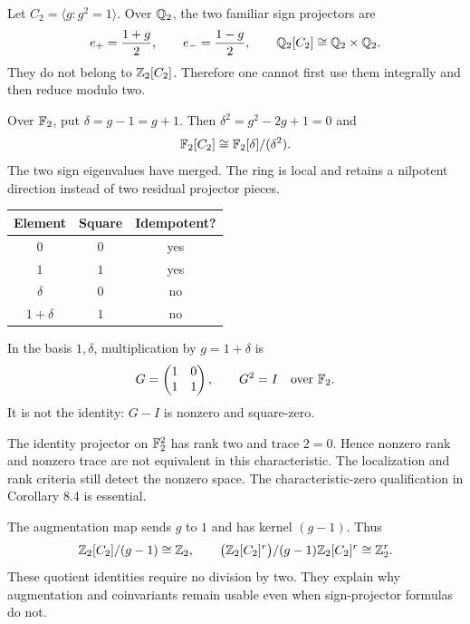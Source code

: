 Let $C_2=\langle g:g^2=1\rangle$. Over $\mathbb Q_2$, the two familiar sign projectors are
\[
e_+=\frac{1+g}{2},\qquad e_-=\frac{1-g}{2},
\qquad \mathbb Q_2[C_2]\cong\mathbb Q_2\times\mathbb Q_2.
\]
They do not belong to $\mathbb Z_2[C_2]$. Therefore one cannot first use them integrally and then reduce modulo two.

Over $\mathbb F_2$, put $\delta=g-1=g+1$. Then $\delta^2=g^2-2g+1=0$ and
\[
\mathbb F_2[C_2]\cong\mathbb F_2[\delta]/(\delta^2).
\]
The two sign eigenvalues have merged. The ring is local and retains a nilpotent direction instead of two residual projector pieces.

\begin{minipage}[c]{.48\linewidth}
\centering
\begin{tabular}{@{}ccc@{}}\toprule
Element & Square & Idempotent?\\\midrule
$0$ & $0$ & yes\\
$1$ & $1$ & yes\\
$\delta$ & $0$ & no\\
$1+\delta$ & $1$ & no\\\bottomrule
\end{tabular}
\end{minipage}\hfill
\begin{minipage}[c]{.47\linewidth}
In the basis $1,\delta$, multiplication by $g=1+\delta$ is
\[
G=\begin{pmatrix}1&0\\1&1\end{pmatrix},\qquad
G^2=I\quad\text{over }\mathbb F_2.
\]
It is not the identity: $G-I$ is nonzero and square-zero.
\end{minipage}

The identity projector on $\mathbb F_2^2$ has rank two and trace $2=0$. Hence nonzero rank and nonzero trace are not equivalent in this characteristic. The localization and rank criteria still detect the nonzero space. The characteristic-zero qualification in Corollary 8.4 is essential.

The augmentation map sends $g$ to $1$ and has kernel $(g-1)$. Thus
\[
\mathbb Z_2[C_2]/(g-1)\cong\mathbb Z_2,
\qquad
\bigl(\mathbb Z_2[C_2]^r\bigr)/(g-1)\mathbb Z_2[C_2]^r\cong\mathbb Z_2^r.
\]
These quotient identities require no division by two. They explain why augmentation and coinvariants remain usable even when sign-projector formulas do not.

